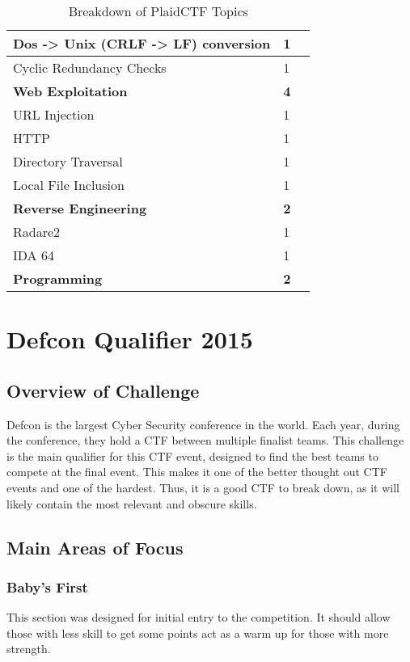 \documentclass[a4paper,11pt]{report}
\begin{document}
\begin{table}[htb]
\begin{tabular}{| l | l | l |}
				\quad Dos -> Unix (CRLF -> LF) conversion & 1 & \\ \hline 
				\quad Cyclic Redundancy Checks & 1 & \\ \hline
				\textbf{Web Exploitation} & \textbf{4} & \\ \hline
				\quad URL Injection & 1 & \\ \hline
				\quad HTTP & 1 & \\ \hline 
				\quad Directory Traversal & 1 & \\ \hline
				\quad Local File Inclusion & 1 & \\ \hline 
				\textbf{Reverse Engineering} & \textbf{2} & \\ \hline
				\quad Radare2 & 1 & \\ \hline
				\quad IDA 64 & 1 & \\ \hline 
				\textbf{Programming} & \textbf{2} & \\ \hline
			\end{tabular}
			\caption{Breakdown of PlaidCTF Topics}
			\label{tab:PlaidCTF Breakdown}
		\end{table}

\chapter{Defcon Qualifier 2015}
	\section{Overview of Challenge}
		Defcon is the largest Cyber Security conference in the world. 
		Each year, during the conference, they hold a CTF between multiple finalist teams. 
		This challenge is the main qualifier for this CTF event, designed to find the best teams to compete at the final event. 
		This makes it one of the better thought out CTF events and one of the hardest. 
		Thus, it is a good CTF to break down, as it will likely contain the most relevant and obscure skills. 
	
	\section{Main Areas of Focus}
		\subsection{Baby's First}
			This section was designed for initial entry to the competition. 
			It should allow those with less skill to get some points act as a warm up for those with more strength. 
\end{document}
